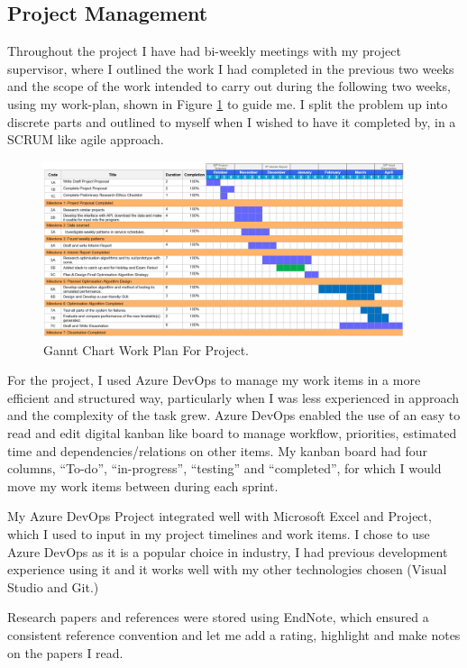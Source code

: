 \documentclass{article}
\begin{document}
\subsection{Project Management}
Throughout the project I have had bi-weekly meetings with my project supervisor, where I outlined the work I had completed in the previous two weeks and the scope of the work intended to carry out during the following two weeks, using my work-plan, shown in Figure \ref{fig:workPlan} to guide me. I split the problem up into discrete parts and outlined to myself when I wished to have it completed by, in a SCRUM like agile approach.

\begin{figure}[H]
	\centering
	\includegraphics[width=400px]{images/ganntChartV4.PNG}
	\caption{Gannt Chart Work Plan For Project.}
	\label{fig:workPlan}
\end{figure}


\par 
For the project, I used Azure DevOps to manage my work items in a more efficient and structured way, particularly when I was less experienced in approach and the complexity of the task grew. Azure DevOps enabled the use of an easy to read and edit digital kanban like board to manage workflow, priorities, estimated time and dependencies/relations on other items. My kanban board had four columns, ``To-do'', ``in-progress'', ``testing'' and ``completed'', for which I would move my work items between during each sprint. 


\par 
My Azure DevOps Project integrated well with Microsoft Excel and Project, which I used to input in my project timelines and work items. I chose to use Azure DevOps as it is a popular choice in industry, I had previous development experience using it and it works well with my other technologies chosen (Visual Studio and Git.)

\par
Research papers and references were stored using EndNote, which ensured a consistent reference convention and let me add a rating, highlight and make notes on the papers I read.  
\end{document}
